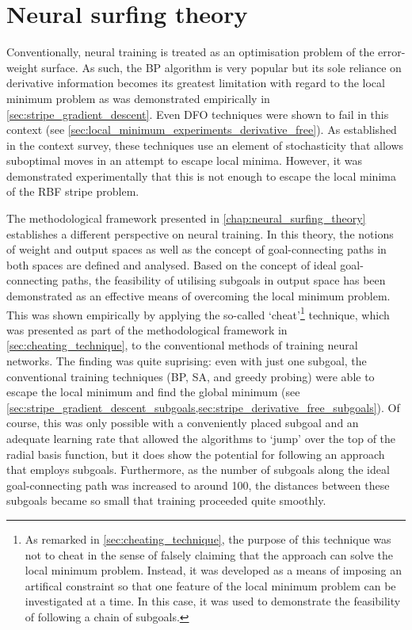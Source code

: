 \section{Neural surfing theory}
\label{sec:eval_neural_surfing}
Conventionally, neural training is treated as an optimisation problem of the error-weight surface.
As such, the BP algorithm is very popular but its sole reliance on derivative information becomes its greatest limitation with regard to the local minimum problem as was demonstrated empirically in \ref{sec:stripe_gradient_descent}.
Even DFO techniques were shown to fail in this context (see \ref{sec:local_minimum_experiments_derivative_free}).
As established in the context survey, these techniques use an element of stochasticity that allows suboptimal moves in an attempt to escape local minima.
However, it was demonstrated experimentally that this is not enough to escape the local minima of the RBF stripe problem.

The methodological framework presented in \ref{chap:neural_surfing_theory} establishes a different perspective on neural training.
In this theory, the notions of weight and output spaces as well as the concept of goal-connecting paths in both spaces are defined and analysed.
Based on the concept of ideal goal-connecting paths, the feasibility of utilising subgoals in output space has been demonstrated as an effective means of overcoming the local minimum problem.
This was shown empirically by applying the so-called `cheat'\footnote{As remarked in \ref{sec:cheating_technique}, the purpose of this technique was not to cheat in the sense of falsely claiming that the approach can solve the local minimum problem. Instead, it was developed as a means of imposing an artifical constraint so that one feature of the local minimum problem can be investigated at a time. In this case, it was used to demonstrate the feasibility of following a chain of subgoals.} technique, which was presented as part of the methodological framework in \ref{sec:cheating_technique}, to the conventional methods of training neural networks.
The finding was quite suprising: even with just one subgoal, the conventional training techniques (BP, SA, and greedy probing) were able to escape the local minimum and find the global minimum (see \ref{sec:stripe_gradient_descent_subgoals,sec:stripe_derivative_free_subgoals}).
Of course, this was only possible with a conveniently placed subgoal and an adequate learning rate that allowed the algorithms to `jump' over the top of the radial basis function, but it does show the potential for following an approach that employs subgoals.
Furthermore, as the number of subgoals along the ideal goal-connecting path was increased to around 100, the distances between these subgoals became so small that training proceeded quite smoothly.

